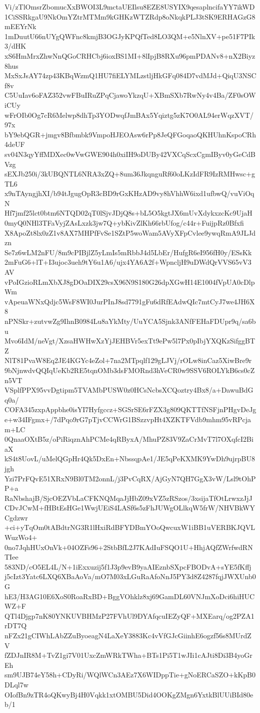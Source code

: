 Vi/zTlOmsrZbomucXxBWOI3L9mctaUEIlsu8EZE8USYIX9qesaplncifaYY7ikWD
1CiSSRkgaU9NkOmYZtrMTMm9kGHKzWTZRdp8oNkqkPLJ3tSK9ERHAGzG8mEEYrNk
1mDuutU66nUYgQWFnc8kmjB3OGJyKPQfTed8LO3QM+e5NlnXV+pe51F7PIk3/dHK
xS6HmMrxZhwNnQGoCRHCbj6ioxBS1MI+8lIpjB8RXu96pmPDANv8+nX2Biyz8hus
MxSxJsAY74zp43KBqWzmQ1HU7fiELYMLzstljHkGFq084D7vdMJd+QiqU3NSCf8v
C5UuIav6oFAZ352vwFBuIRuZPqCjawoYkzqU+XBmSXb7RwNy4v4Ba/ZF0sOWiCUy
wFrOIb0Og7cR6Melwp8dhTp3YODwqfJmBAx5Yqiztg5zK7O0AL94erWqzXVT/97x
bY9ebQGR+jmgv8Bfbmbk9VmpoHJEOAsw6rPp8JeQFGoqaoQKHUhnKspoCRh4deUF
sv04N3qyYffMDXec0wVwGWE904h0xiIH9oDUBy42VXCqScxCgmIByv0yGeCdBVzg
sEXJb250i/3kUBQNTL6NRA3xZQ+8um36JkqnguRf60oLKzIdFR9IzRMHwsc+gTL6
x9nTAyngjhXI/b94tJgugOpR3cBD9rGxKHzAD9vy8hVhhW6ixd1ufbwQ/vuViOqN
Hf7jmf25lct0btm6NTQD02qT0lSjvJDjQ8s+bL5O5kgtJX6mUvXdykxzcKc9UjaH
0myQ0NHl3TFaVyjZAsLxzk3jw7Q+ybKivZlKh66rbUfog/c44r+FuijpRz0Bfxfi
X8ApoZt8lx0zZ1v8AX7MHPfFvSe1SZtP5woWam5AVyXFpCvlee9ywqRmA9JLJdzn
Se7z6wLM2nFU/8m9cPIBjlZ5yLmIs5mRbbJ4d5LbEr/HufgR6eI956fH0y/ESsKk
2mFuG6+lT+I3ujoc3ueh9tY6u1A6/ujx4YA6A2f+WpncljH9uDWdQrVVS65vV3AV
vPoIGzioRLmXbXJ8gDOaDIX29csX96N9S180G26dpXGwH14E1004fVpUA0cDlpWm
vApeuaWNxQdjc5WsF8WI0JurPInJ8sd7791gFu6dRfEAdwQIc7mtCyJ7we4JH6X8
nPNSkr+zutvwZg9IhnB0984Lu8aYkMty/UuYCA5Sjnk3ANfFEHaFDUpr9q/sa6bu
Mvo6IdM/neVgt/XzsaHWHwXzYjJEHBVr5exTt9ePw5l7Px0pIbjYXQKzSifggBTZ
NlT81PvaW8Eq2JE4KGYc4eZol+7na2MTpqlf129gLJVj/rOLw8inCaz5XiwBre9r
9bNjnwdvQQIqUeKb2RE5tqnOMb3dsFMORnd3hVeCR0w9SSV6ROLYkB6cs0cZn5VT
VSplfPPX95vvDgtipm5TVAMbPUSW0z0HCsNcbsXCQoztry4Bx8/a+DawuBdGq0a/
COFA345zxpAppbhe0isYI7Hyfgccz+SGSrSE6rFZX3g809QKTTfNSFjnPHgvDeJg
e+w34IFgmx+/7dPqo9rG7pTjvCCWrG1BSzzvpHt4XZKTFVdb9mhm95vRPcjam+LC
0QnaaOXtB5z/oPiRiqznAhPCMe4qRByxA/MhuPZ83V9ZaCrMvT7l7OXqfcI2BiaX
kS4t8UovL/uMelQGpHr4Qk5DxEn+NbssqpAe1/JE5qPeKXMK9YwDh9ujrpBU8jgh
Yzi7PrFQvE51XRxN9Bl0TM2onnL/j3PvCqRX/AjGyN7QH7GgX3vW/Lsl9tOhPP+a
RaNbshajB/SjcOEZVbLaCFKNQMqaJjHbZ09xVZ5zRSzos/3xsijaTfOtLrwxzJjJ
CDvJCwM+fHBtEsHGe1WwjUEiS4LASf6s5zFhJUWgOLlkqW5frW/NHVBkWYCgdzwr
+ci+yTqOm0tABdtrNG3R1lHxiRdBFYDBmYOoQwcuxW1iBB1uVERBKJQVLWuzWo4+
0no7JqhHUxOnVk+04OZFs96+2StbBfL2J7KAdIuFSQO1U+HhjAQfZWrfwdRNTIee
583ND/cO5EL4L/N+1iExxuzij5f1J3p9evB9yaAIEznbSXpcFBODvA+sYE5fKffj
j5cIzt3Yatc6LXQ6XBaAoVa/mO7M03xLGuRaAfoNnJ5PY3d8Z4287fqjJWXUnb0G
hE3/H3AG10E6XoS0RoaRxBD+BggVOhklz8xj69GamDL60VNJmXoDci6hiHUCWZ+F
QTl4Djgp7nK80YNKUVBHMzP27FVhUl9DYAfqcuIEZyQF+MXEarq/og2PZA1rDT7Q
nFZx21gCIWhLAbZZuByoeagN4LaXeY3883Kc4vVfGJcGiinhE6ogzf56s8MUrdZV
fZDJnIR8M+TvZ1gi7V01UxcZmWRkTWha+BTs1Pi5T1wJIi1cAJti8Di3B4yoGrEh
sm9UJB74eY58h+CDyRi/WQlWCn3AEz7X6WIDppTie+gNoERCaSZO+kKpB0DLql7w
OIofBn9zTR4oQKwyBj4H0Vqkk1xtOMBU5Did4OOKgZMgn6YxtkBlUUiBId80eb/1
